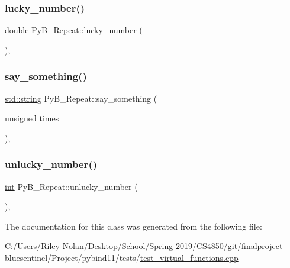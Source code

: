 \subsubsection{\texorpdfstring{lucky\_number()}{lucky\_number()}}
{\footnotesize\ttfamily double Py\+B\+\_\+\+Repeat\+::lucky\+\_\+number (\begin{DoxyParamCaption}{ }\end{DoxyParamCaption})\hspace{0.3cm}{\ttfamily [inline]}, {\ttfamily [override]}}

\mbox{\label{class_py_b___repeat_a1640acd7dd1456e2d50e3ed8dce6a9ff}} 
\subsubsection{\texorpdfstring{say\_something()}{say\_something()}}
{\footnotesize\ttfamily \mbox{\hyperlink{_s_d_l__opengl__glext_8h_ab4ccfaa8ab0e1afaae94dc96ef52dde1}{std\+::string}} Py\+B\+\_\+\+Repeat\+::say\+\_\+something (\begin{DoxyParamCaption}\item[{unsigned}]{times }\end{DoxyParamCaption})\hspace{0.3cm}{\ttfamily [inline]}, {\ttfamily [override]}}

\mbox{\label{class_py_b___repeat_a83d9f51319d6475a83c72dcef4049bd9}} 
\subsubsection{\texorpdfstring{unlucky\_number()}{unlucky\_number()}}
{\footnotesize\ttfamily \mbox{\hyperlink{warnings_8h_a74f207b5aa4ba51c3a2ad59b219a423b}{int}} Py\+B\+\_\+\+Repeat\+::unlucky\+\_\+number (\begin{DoxyParamCaption}{ }\end{DoxyParamCaption})\hspace{0.3cm}{\ttfamily [inline]}, {\ttfamily [override]}}



The documentation for this class was generated from the following file\+:\begin{DoxyCompactItemize}
\item 
C\+:/\+Users/\+Riley Nolan/\+Desktop/\+School/\+Spring 2019/\+C\+S4850/git/finalproject-\/bluesentinel/\+Project/pybind11/tests/\mbox{\hyperlink{test__virtual__functions_8cpp}{test\+\_\+virtual\+\_\+functions.\+cpp}}\end{DoxyCompactItemize}
